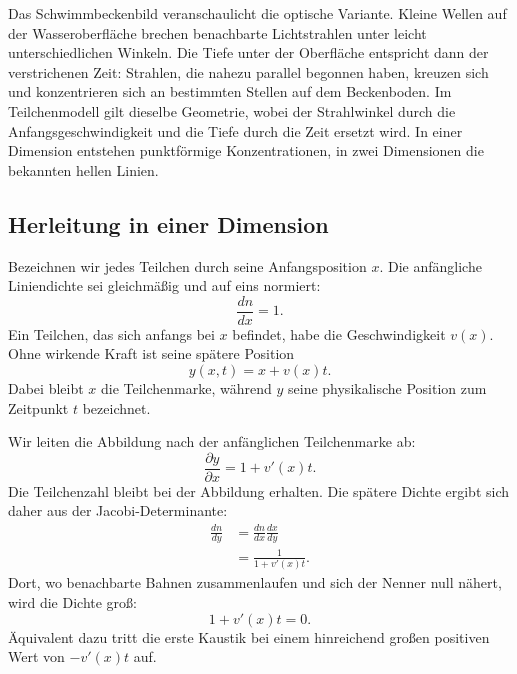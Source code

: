 \begin{classroomqa}
\end{classroomqa}

Das Schwimmbeckenbild veranschaulicht die optische Variante. Kleine Wellen auf der Wasseroberfläche brechen benachbarte Lichtstrahlen unter leicht unterschiedlichen Winkeln. Die Tiefe unter der Oberfläche entspricht dann der verstrichenen Zeit: Strahlen, die nahezu parallel begonnen haben, kreuzen sich und konzentrieren sich an bestimmten Stellen auf dem Beckenboden. Im Teilchenmodell gilt dieselbe Geometrie, wobei der Strahlwinkel durch die Anfangsgeschwindigkeit und die Tiefe durch die Zeit ersetzt wird. In einer Dimension entstehen punktförmige Konzentrationen, in zwei Dimensionen die bekannten hellen Linien.

\subsection{Herleitung in einer Dimension}

Bezeichnen wir jedes Teilchen durch seine Anfangsposition \(x\). Die anfängliche Liniendichte sei gleichmäßig und auf eins normiert:
\begin{equation}
\frac{dn}{dx}=1.
\label{eq:c09-initial-density}
\end{equation}
Ein Teilchen, das sich anfangs bei \(x\) befindet, habe die Geschwindigkeit \(v(x)\). Ohne wirkende Kraft ist seine spätere Position
\begin{equation}
y(x,t)=x+v(x)t.
\label{eq:c09-ballistic-map}
\end{equation}
Dabei bleibt \(x\) die Teilchenmarke, während \(y\) seine physikalische Position zum Zeitpunkt \(t\) bezeichnet.

Wir leiten die Abbildung nach der anfänglichen Teilchenmarke ab:
\begin{equation}
\frac{\partial y}{\partial x}
=1+v'(x)t.
\label{eq:c09-jacobian}
\end{equation}
Die Teilchenzahl bleibt bei der Abbildung erhalten. Die spätere Dichte ergibt sich daher aus der Jacobi-Determinante:
\begin{align}
\frac{dn}{dy}
&=
\frac{dn}{dx}\frac{dx}{dy}\\
&=
\frac{1}{1+v'(x)t}.
\label{eq:c09-caustic-density}
\end{align}
Dort, wo benachbarte Bahnen zusammenlaufen und sich der Nenner null nähert, wird die Dichte groß:
\begin{equation}
1+v'(x)t=0.
\label{eq:c09-caustic-condition}
\end{equation}
Äquivalent dazu tritt die erste Kaustik bei einem hinreichend großen positiven Wert von \(-v'(x)t\) auf.

